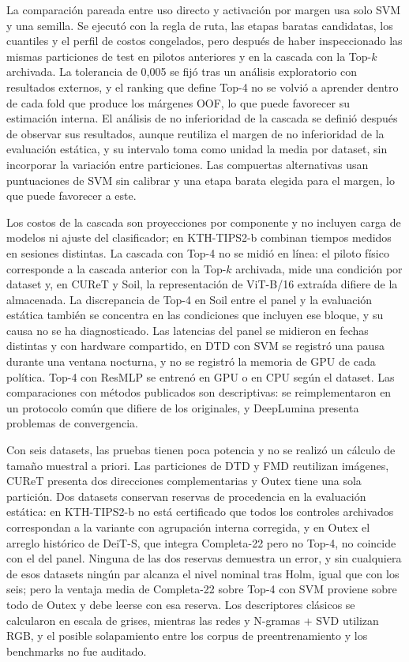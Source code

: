 \documentclass[a4paper,fleqn]{cas-sc}
\begin{document}
La comparación pareada entre uso directo y activación por margen usa solo SVM y una semilla. Se ejecutó con la regla de ruta, las etapas baratas candidatas, los cuantiles y el perfil de costos congelados, pero después de haber inspeccionado las mismas particiones de test en pilotos anteriores y en la cascada con la Top-$k$ archivada. La tolerancia de 0,005 se fijó tras un análisis exploratorio con resultados externos, y el ranking que define Top-4 no se volvió a aprender dentro de cada fold que produce los márgenes OOF, lo que puede favorecer su estimación interna. El análisis de no inferioridad de la cascada se definió después de observar sus resultados, aunque reutiliza el margen de no inferioridad de la evaluación estática, y su intervalo toma como unidad la media por dataset, sin incorporar la variación entre particiones. Las compuertas alternativas usan puntuaciones de SVM sin calibrar y una etapa barata elegida para el margen, lo que puede favorecer a este.

Los costos de la cascada son proyecciones por componente y no incluyen carga de modelos ni ajuste del clasificador; en KTH-TIPS2-b combinan tiempos medidos en sesiones distintas. La cascada con Top-4 no se midió en línea: el piloto físico corresponde a la cascada anterior con la Top-$k$ archivada, mide una condición por dataset y, en CUReT y Soil, la representación de ViT-B/16 extraída difiere de la almacenada. La discrepancia de Top-4 en Soil entre el panel y la evaluación estática también se concentra en las condiciones que incluyen ese bloque, y su causa no se ha diagnosticado. Las latencias del panel se midieron en fechas distintas y con hardware compartido, en DTD con SVM se registró una pausa durante una ventana nocturna, y no se registró la memoria de GPU de cada política. Top-4 con ResMLP se entrenó en GPU o en CPU según el dataset. Las comparaciones con métodos publicados son descriptivas: se reimplementaron en un protocolo común que difiere de los originales, y DeepLumina presenta problemas de convergencia.

Con seis datasets, las pruebas tienen poca potencia y no se realizó un cálculo de tamaño muestral a priori. Las particiones de DTD y FMD reutilizan imágenes, CUReT presenta dos direcciones complementarias y Outex tiene una sola partición. Dos datasets conservan reservas de procedencia en la evaluación estática: en KTH-TIPS2-b no está certificado que todos los controles archivados correspondan a la variante con agrupación interna corregida, y en Outex el arreglo histórico de DeiT-S, que integra Completa-22 pero no Top-4, no coincide con el del panel. Ninguna de las dos reservas demuestra un error, y sin cualquiera de esos datasets ningún par alcanza el nivel nominal tras Holm, igual que con los seis; pero la ventaja media de Completa-22 sobre Top-4 con SVM proviene sobre todo de Outex y debe leerse con esa reserva. Los descriptores clásicos se calcularon en escala de grises, mientras las redes y N-gramas + SVD utilizan RGB, y el posible solapamiento entre los corpus de preentrenamiento y los benchmarks no fue auditado.
\end{document}
